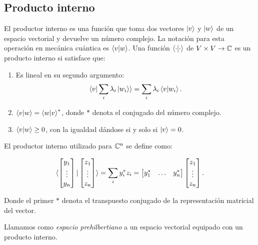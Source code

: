 \subsection{Producto interno}

El productor interno es una función que toma dos vectores $\ket{v}$ y $\ket{w}$ de un espacio vectorial y devuelve un número complejo. La notación para esta operación en mecánica cuántica es $\braket{v|w}$.
Una función $\braket{\cdot|\cdot}$ de $V \times V \rightarrow \mathbb{C}$ es un producto interno  si satisface que:
\begin{enumerate}
    \item  Es lineal en su segundo argumento:
    \begin{equation}
        \braket{v|\sum_i \lambda_i \ket{w_i}} = \sum_i \lambda_i \braket{v|w_i}.
    \end{equation}
    \item $\braket{v|w} = \braket{w|v}^*$, donde $*$ denota el conjugado del número complejo.
    \item $\braket{v|w} \geq 0$, con la igualdad dándose si y solo si $\ket{v} = 0$.
\end{enumerate}

El productor interno utilizado para $\mathbb{C}^n$ se define como:

\begin{equation}\label{eq:inner_prod}
    \braket{\begin{bmatrix}y_1 \\ \vdots \\ y_n\end{bmatrix} | \begin{bmatrix}z_1 \\ \vdots \\ z_n\end{bmatrix}} = \sum_i y_i^* z_i = \begin{bmatrix}
y_1^* & \dots & y_n^*
\end{bmatrix} \begin{bmatrix}
    z_1 \\
    \vdots \\
    z_n
\end{bmatrix}.
\end{equation}

Donde el primer $*$ denota el transpuesto conjugado de la representación matricial del vector.

Llamamos como \emph{espacio prehilbertiano} a un espacio vectorial equipado con un producto interno.


